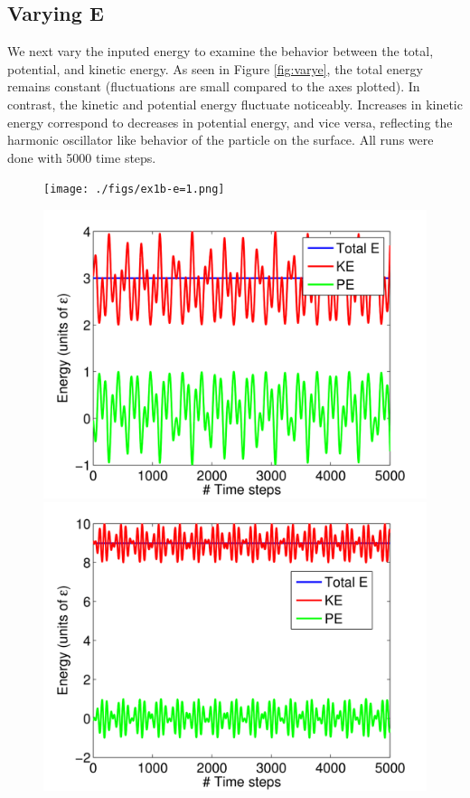 \documentclass[12pt, oneside]{article}
\begin{document}
\subsection{Varying E}

We next vary the inputed energy to examine the behavior between the total, potential, and kinetic energy. As seen in Figure \ref{fig:varye}, the total energy remains constant (fluctuations are small compared to the axes plotted). In contrast, the kinetic and potential energy fluctuate noticeably. Increases in kinetic energy correspond to decreases in potential energy, and vice versa, reflecting the harmonic oscillator like behavior of the particle on the surface. All runs were done with 5000 time steps.

\begin{figure}
\begin{minipage}[!htbp]{.5\linewidth}
\texttt{[image: ./figs/ex1b-e=1.png]}
\subcaption{}
\end{minipage}
\hspace{0.02\linewidth}
\begin{minipage}[!htbp]{.5\linewidth}
\includegraphics[width=\textwidth]{./figs/ex1b-e=3.png}
\subcaption{}
\end{minipage}
\hspace{0.02\linewidth}
\begin{minipage}[!htbp]{.5\linewidth}
\includegraphics[width=\textwidth]{./figs/ex1b-e=10.png}

\end{minipage}
\end{figure}
\end{document}
